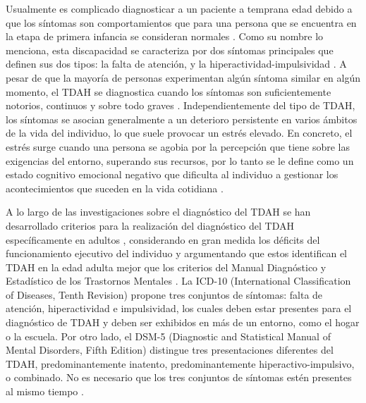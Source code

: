\documentclass[10pt,journal,compsoc]{IEEEtran}
\begin{document}
Usualmente es complicado diagnosticar a un paciente a temprana edad debido a que los síntomas son comportamientos que para una persona que se encuentra en la etapa de primera infancia se consideran normales \cite{national-institute-of-mental-health-no-date}. Como su nombre lo menciona, esta discapacidad se caracteriza por dos síntomas principales que definen sus dos tipos: la falta de atención, y la hiperactividad-impulsividad \cite{combs2015perceived}. A pesar de que la mayoría de personas experimentan algún síntoma similar en algún momento, el TDAH se diagnostica cuando los síntomas son suficientemente notorios, continuos y sobre todo graves \cite{chen-2023}. Independientemente del tipo de TDAH, los síntomas se asocian generalmente a un deterioro persistente en varios ámbitos de la vida del individuo, lo que suele provocar un estrés elevado. En concreto, el estrés surge cuando una persona se agobia por la percepción que tiene sobre las exigencias del entorno, superando sus recursos, por lo tanto se le define como un estado cognitivo emocional negativo que dificulta al individuo a gestionar los acontecimientos que suceden en la vida cotidiana \cite{combs2015perceived}. 

A lo largo de las investigaciones sobre el diagnóstico del TDAH se han desarrollado criterios para la realización del diagnóstico del TDAH específicamente en adultos \cite{combs2015perceived}, considerando en gran medida los déficits del funcionamiento ejecutivo del individuo y argumentando que estos identifican el TDAH en la edad adulta mejor que los criterios del Manual Diagnóstico y Estadístico de los Trastornos Mentales \cite{american2000diagnostic}. La ICD-10 (International Classification of Diseases, Tenth Revision) propone tres conjuntos de síntomas: falta de atención, hiperactividad e impulsividad, los cuales deben estar presentes para el diagnóstico de TDAH y deben ser exhibidos en más de un entorno, como el hogar o la escuela. Por otro lado, el DSM-5 (Diagnostic and Statistical Manual of Mental Disorders, Fifth Edition) distingue tres presentaciones diferentes del TDAH, predominantemente inatento, predominantemente hiperactivo-impulsivo, o combinado. No es necesario que los tres conjuntos de síntomas estén presentes al mismo tiempo \cite{doernberg2016neurodevelopmental}.
\end{document}
